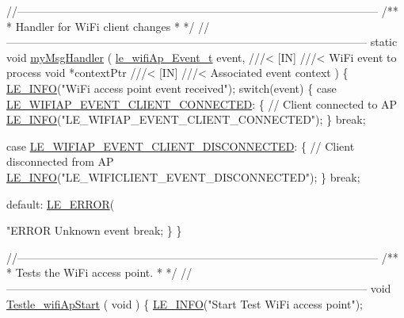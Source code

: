 \begin{DoxyCodeInclude}
\textcolor{comment}{//--------------------------------------------------------------------------------------------------}\textcolor{comment}{}
\textcolor{comment}{/**}
\textcolor{comment}{ * Handler for WiFi client changes}
\textcolor{comment}{ *}
\textcolor{comment}{ */}
\textcolor{comment}{//--------------------------------------------------------------------------------------------------}
\textcolor{keyword}{static} \textcolor{keywordtype}{void} \hyperlink{wifi_ap_test_8c_a7954929c29b59e7288ead4cdbc1cceea}{myMsgHandler}
(
    \hyperlink{le__wifi_ap__interface_8h_aeac8ad63bcfc5ee984cdd86ec9f116d5}{le\_wifiAp\_Event\_t} event,\textcolor{comment}{}
\textcolor{comment}{        ///< [IN]}
\textcolor{comment}{        ///< WiFi event to process}
\textcolor{comment}{}    \textcolor{keywordtype}{void} *contextPtr\textcolor{comment}{}
\textcolor{comment}{        ///< [IN]}
\textcolor{comment}{        ///< Associated event context}
\textcolor{comment}{})
\{
    \hyperlink{le__log_8h_a23e6d206faa64f612045d688cdde5808}{LE\_INFO}(\textcolor{stringliteral}{"WiFi access point event received"});
    \textcolor{keywordflow}{switch}(event)
    \{
        \textcolor{keywordflow}{case} \hyperlink{le__wifi_ap__interface_8h_aeac8ad63bcfc5ee984cdd86ec9f116d5a77e1636cb334d7bdde04761d333ff284}{LE\_WIFIAP\_EVENT\_CLIENT\_CONNECTED}:
        \{
            \textcolor{comment}{// Client connected to AP}
            \hyperlink{le__log_8h_a23e6d206faa64f612045d688cdde5808}{LE\_INFO}(\textcolor{stringliteral}{"LE\_WIFIAP\_EVENT\_CLIENT\_CONNECTED"});
        \}
        \textcolor{keywordflow}{break};

        \textcolor{keywordflow}{case} \hyperlink{le__wifi_ap__interface_8h_aeac8ad63bcfc5ee984cdd86ec9f116d5a6d0e05c5fb1ec89d873b96dae320ca6e}{LE\_WIFIAP\_EVENT\_CLIENT\_DISCONNECTED}:
        \{
            \textcolor{comment}{// Client disconnected from AP}
            \hyperlink{le__log_8h_a23e6d206faa64f612045d688cdde5808}{LE\_INFO}(\textcolor{stringliteral}{"LE\_WIFICLIENT\_EVENT\_DISCONNECTED"});
        \}
        \textcolor{keywordflow}{break};


        \textcolor{keywordflow}{default}:
            \hyperlink{le__log_8h_a353590f91b3143a7ba3a416ae5a50c3d}{LE\_ERROR}(\textcolor{stringliteral}{"ERROR Unknown event %
        \textcolor{keywordflow}{break};
    \}
\}


\textcolor{comment}{//--------------------------------------------------------------------------------------------------}\textcolor{comment}{}
\textcolor{comment}{/**}
\textcolor{comment}{ * Tests the WiFi access point.}
\textcolor{comment}{ *}
\textcolor{comment}{ */}
\textcolor{comment}{//--------------------------------------------------------------------------------------------------}
\textcolor{keywordtype}{void} \hyperlink{wifi_ap_test_8c_af54714520578f74d1cf0ef5e94b69580}{Testle\_wifiApStart}
(
    \textcolor{keywordtype}{void}
)
\{
    \hyperlink{le__log_8h_a23e6d206faa64f612045d688cdde5808}{LE\_INFO}(\textcolor{stringliteral}{"Start Test WiFi access point"});

}
\end{DoxyCodeInclude}
